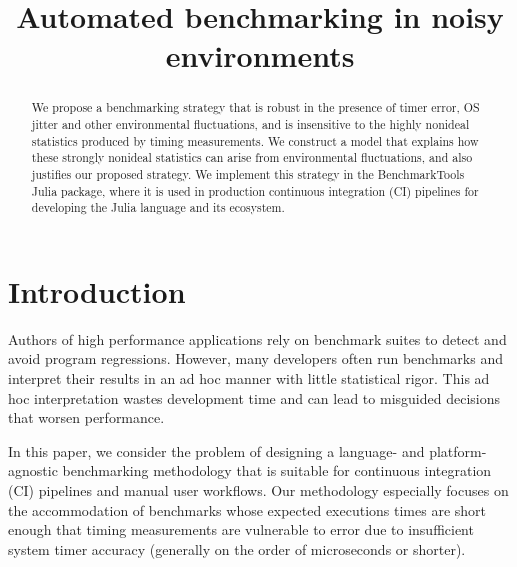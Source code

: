 \documentclass[conference]{IEEEtran}
\begin{document}
\title{Automated benchmarking in noisy environments}

\author{
}

\maketitle

\begin{abstract}
We propose a benchmarking strategy that is robust in the presence of timer
error, OS jitter and other environmental fluctuations, and is insensitive to
the highly nonideal statistics produced by timing measurements.
We construct a model that explains how these strongly nonideal statistics can
arise from environmental fluctuations, and also justifies our proposed
strategy. We implement this strategy in the BenchmarkTools Julia package, where
it is used in production continuous integration (CI) pipelines for developing
the Julia language and its ecosystem.
\end{abstract}

\IEEEpeerreviewmaketitle

\section{Introduction}
\label{sec:intro}

Authors of high performance applications rely on benchmark suites to detect and avoid
program regressions. However, many developers often run benchmarks and interpret their
results in an ad hoc manner with little statistical rigor. This ad hoc interpretation wastes
development time and can lead to misguided decisions that worsen performance.

In this paper, we consider the problem of designing a language- and
platform-agnostic benchmarking methodology that is suitable for continuous
integration (CI) pipelines and manual user workflows. Our methodology
especially focuses on the accommodation of benchmarks whose expected executions
times are short enough that timing measurements are vulnerable to error due to
insufficient system timer accuracy (generally on the order of microseconds or
shorter).
\end{document}
